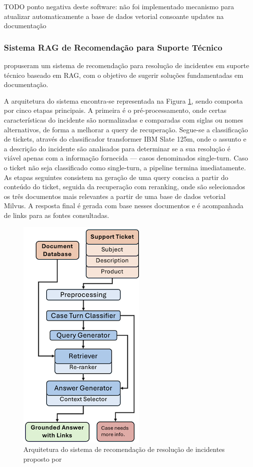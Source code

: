 TODO ponto negativa deste software: não foi implementado mecanismo para atualizar automaticamente a base de dados vetorial consoante updates na documentação


\subsubsection{Sistema RAG de Recomendação para Suporte Técnico} 

\cite{isaza2024retrieval} propuseram um sistema de recomendação para resolução de incidentes em suporte técnico baseado em RAG, com o objetivo de sugerir soluções fundamentadas em documentação.


A arquitetura do sistema encontra-se representada na Figura \ref{fig:ticket-recomendation-rag}, sendo composta por cinco etapas principais. A primeira é o pré-processamento, onde certas características do incidente são normalizadas e comparadas com siglas ou nomes alternativos, de forma a melhorar a query de recuperação. Segue-se a classificação de tickets, através do classificador transformer IBM Slate 125m, onde o assunto e a descrição do incidente são analisados para determinar se a sua resolução é viável apenas com a informação fornecida — casos denominados single-turn. Caso o ticket não seja classificado como single-turn, a pipeline termina imediatamente.
As etapas seguintes consistem na geração de uma query concisa a partir do conteúdo do ticket, seguida da recuperação com reranking, onde são selecionados os três documentos mais relevantes a partir de uma base de dados vetorial Milvus. A resposta final é gerada com base nesses documentos e é acompanhada de links para as fontes consultadas.

\begin{figure}[H]
        \centering
        \includegraphics[width=0.3\linewidth]{ch3/assets/ticket-recomendation-rag.png
        }
        \caption{Arquitetura do sistema de recomendação de resolução de incidentes proposto por  \cite{isaza2024retrieval}}
        \label{fig:ticket-recomendation-rag}
\end{figure}


